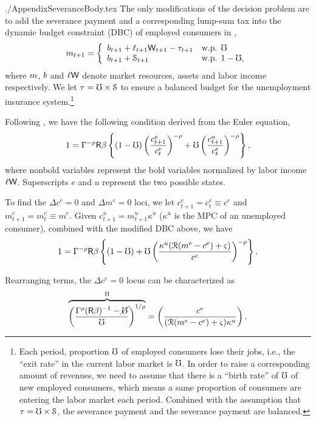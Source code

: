 \documentclass{\econtex}
\begin{document}
\begin{verbatimwrite}{./AppendixSeveranceBody.tex}
The only modifications of the decision problem are to add
the severance payment and a corresponding lump-sum tax into the
dynamic budget constraint (DBC) of employed consumers in
\cite{ctDiscrete},
\begin{displaymath}
    m_{t+1}=\left\{
    \begin{array}{ll}
    b_{t+1}+\ell_{t+1}\mathsf{W}_{t+1}-\tau_{t+1} & \mbox{w.p. } \mho\\
    b_{t+1}+\mathcal{S}_{t+1} & \mbox{w.p. }1-\mho,
    \end{array}
    \right.
\end{displaymath}
where $m$, $b$ and $\ell\mathsf{W}$ denote market resources,
assets and labor income respectively. We let $\tau=\mho\times
\mathcal{S}$ to ensure a balanced budget for the unemployment 
insurance system.\footnote{Each period, proportion
  $\mho$ of employed consumers lose their jobs, i.e., the ``exit
  rate'' in the current labor market is $\mho$.  In order to raise a
  corresponding amount of revenues, we need to assume that there is a
  ``birth rate'' of $\mho$ of new employed consumers, which means a
  same proportion of consumers are entering the labor market each
  period. Combined with the assumption that $\tau=\mho\times
  \mathcal{S}$, the severance payment and the severance payment are
  balanced.} 

Following \cite{ctDiscrete}, we have the following condition derived from the Euler equation,
\begin{equation}
  1  = \Gamma^{-\rho}\mathsf{R}\beta \left\{(1-\mho)\left(\frac{c^{e}_{t+1}}{c^{e}_{t}}\right)^{-\rho}+\mho \left(\frac{c^{u}_{t+1}}{c^{e}_{t}}\right)^{-\rho}\right\},
\end{equation}
where nonbold variables represent the bold variables normalized by
labor income $\ell\mathsf{W}$. Superscripts $e$ and $u$ represent the two
possible states.

To find the $\Delta c^e=0$ and $\Delta m^e=0$ loci, we let
$c_{t+1}^e=c_t^e\equiv c^e$ and $m_{t+1}^e=m_{t}^e\equiv m^e$. Given
$c_{t+1}^u=m_{t+1}^u\kappa^u$ ($\kappa^u$ is the MPC of an unemployed
consumer), combined with the modified DBC above, we have
\begin{equation*}
1 = \Gamma^{-\rho}\mathsf{R}\beta \left\{(1-\mho)+\mho \left(\frac{\kappa^{u}(\mathcal{R}(m^e-c^e)+\varsigma)}{c^{e}}\right)^{-\rho}\right\}.
\end{equation*}

Rearranging terms, the $\Delta c^e=0$ locus can be characterized as
\begin{equation}
\overbrace{\left(\frac{\Gamma^{\rho}(\mathsf{R}\beta)^{-1}-\cancel{\mho}}{\mho}\right)^{1/\rho}}^{\Pi}=\left(\frac{c^e}{(\mathcal{R}(m^e-c^e)+\varsigma)\kappa^{u}}\right).
\end{equation}


\end{verbatimwrite}
\end{document}

